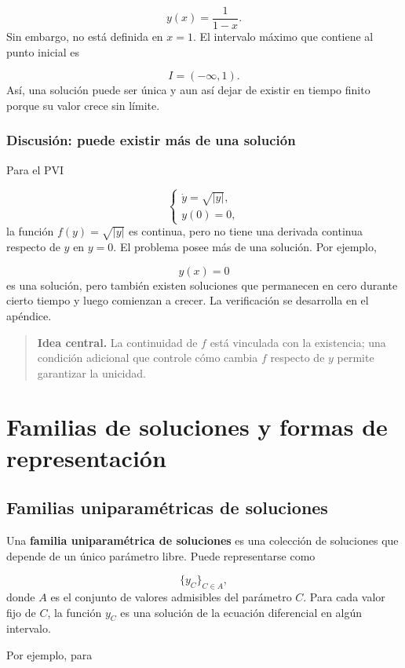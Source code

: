 \documentclass[12pt,a4paper]{article}
\begin{document}
	\[
	y(x)=\frac{1}{1-x}.
	\]
Sin embargo, no está definida en \(x=1\). El intervalo máximo que contiene al punto inicial es

	\[
	I=(-\infty,1).
	\]
	Así, una solución puede ser única y aun así dejar de existir en tiempo finito porque su valor crece sin límite.

	\newpage
	\subsubsection*{Discusión: puede existir más de una solución}

	Para el PVI

	\[
	\begin{cases}
		\dot{y}=\sqrt{|y|},\\
		y(0)=0,
	\end{cases}
	\]
la función \(f(y)=\sqrt{|y|}\) es continua, pero no tiene una derivada continua respecto de \(y\) en \(y=0\). El problema posee más de una solución. Por ejemplo,

	\[
	y(x)=0
	\]
es una solución, pero también existen soluciones que permanecen en cero durante cierto tiempo y luego comienzan a crecer. La verificación se desarrolla en el apéndice.

	\begin{quote}
		\textbf{Idea central.} La continuidad de \(f\) está vinculada con la existencia; una condición adicional que controle cómo cambia \(f\) respecto de \(y\) permite garantizar la unicidad.
	\end{quote}

	\clearpage
	\section{Familias de soluciones y formas de representación}

	\subsection{Familias uniparamétricas de soluciones}

	Una \textbf{familia uniparamétrica de soluciones} es una colección de soluciones que depende de un único parámetro libre. Puede representarse como

	\[
	\{y_C\}_{C\in A},
	\]
donde $A$ es el conjunto de valores admisibles del parámetro $C$. Para cada valor fijo de $C$, la función $y_C$ es una solución de la ecuación diferencial en algún intervalo.

	Por ejemplo, para
\end{document}

